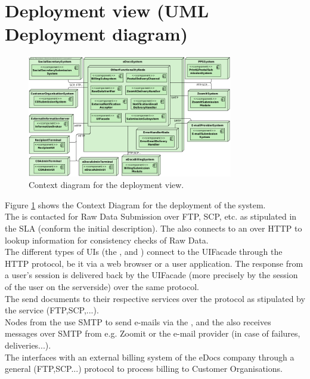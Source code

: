\section{Deployment view (UML Deployment diagram)}\label{sec:deployment}

\begin{figure}
    \centering
    \includegraphics[width=0.8\textwidth]{figures/Deployment Context.png}
    \caption{Context diagram for the deployment view.}\label{fig:depl_context}
\end{figure}

Figure \ref{fig:depl_context} shows the Context Diagram for the deployment of the system.\\
The  is contacted for Raw Data Submission over FTP, SCP, etc. as stipulated in the SLA (conform the initial description). The  also connects to an  over HTTP to lookup information for consistency checks of Raw Data.\\
The different types of UIs (the ,  and ) connect to the UIFacade through the HTTP protocol, be it via a web browser or a user application. The response from a user's session is delivered back by the UIFacade (more precisely by the session of the user on the serverside) over the same protocol.\\
The  send documents to their respective services over the protocol as stipulated by the service (FTP,SCP,...).\\
Nodes from the  use SMTP to send e-mails via the , and the  also receives messages over SMTP from e.g. Zoomit or the e-mail provider (in case of failures, deliveries...).\\
The  interfaces with an external billing system of the eDocs company through a general (FTP,SCP...) protocol to process billing to Customer Organisations.\\

